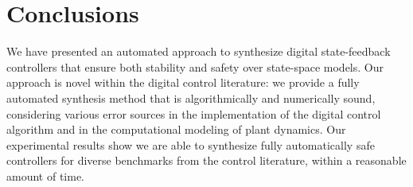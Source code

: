 \documentclass[twocolumn]{autart}    %
\newcommand{\addtodo}[1]{\textcolor{red}{[#1]}}
\renewcommand{\note}[1]{\textcolor{red}{[#1]}}
\begin{document}


\section{Conclusions}
\label{sec:conclusions}

We have presented an automated approach to synthesize digital
state-feedback controllers that ensure both stability and safety over state-space models.   
%
Our approach is novel within the digital control literature: we provide a fully
automated synthesis method that is algorithmically and numerically sound,
considering various error sources in the implementation of the digital
control algorithm and in the computational modeling of plant dynamics.
%
Our experimental results show we are able to synthesize fully automatically 
safe controllers for diverse benchmarks from the control literature, 
within a reasonable amount of time.  


%




\end{document}
